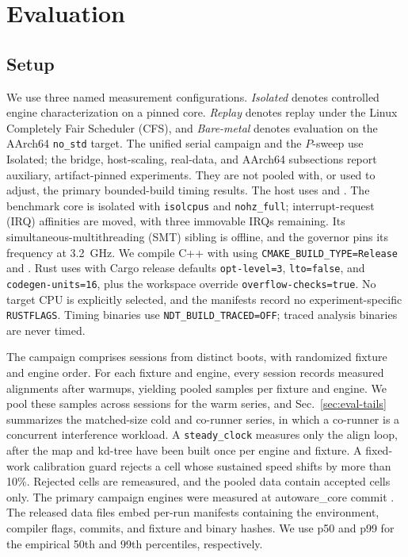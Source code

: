 \section{Evaluation}
\label{sec:evaluation}

\subsection{Setup}
\label{sec:eval-setup}
We use three named measurement configurations. \emph{Isolated} denotes controlled engine
characterization on a pinned core. \emph{Replay} denotes replay under the Linux Completely
Fair Scheduler (CFS), and \emph{Bare-metal} denotes evaluation on the AArch64
\texttt{no\_std} target. The unified serial campaign and the $P$-sweep use Isolated;
the bridge, host-scaling, real-data, and AArch64 subsections report auxiliary,
artifact-pinned experiments. They are not pooled with, or used to adjust, the primary
bounded-build timing results. The host uses \envCpu{} and \envKernel{}. The benchmark core is
isolated with \texttt{isolcpus} and \texttt{nohz\_full}; interrupt-request (IRQ)
affinities are moved, with
three immovable IRQs remaining. Its simultaneous-multithreading (SMT) sibling is offline, and the \envGovernor{}
governor pins its frequency at \SI{3.2}{GHz}. We compile C++ with \envCppCompiler{} using
\texttt{CMAKE\_BUILD\_TYPE=Release} and \envCppReleaseFlags. Rust uses
\envRustCompiler{} with Cargo release defaults \texttt{opt-level=3},
\texttt{lto=false}, and \texttt{codegen-units=16}, plus the workspace override
\texttt{overflow-checks=true}. No target CPU is explicitly selected, and the manifests
record no experiment-specific \texttt{RUSTFLAGS}. Timing binaries use
\texttt{NDT\_BUILD\_TRACED=OFF}; traced analysis binaries are never timed.

The campaign comprises \envSessions{} sessions from distinct boots, with randomized
fixture and engine order. For each fixture and engine, every session records
\envSamplesPerSession{} measured alignments after \envWarmup{} warmups, yielding
\envPooledSamples{} pooled samples per fixture and engine. We pool these samples across
sessions for the warm series, and Sec.~\ref{sec:eval-tails} summarizes the matched-size
cold and co-runner series, in which a co-runner is a concurrent interference workload.
A \texttt{steady\_clock} measures only the align loop, after the map
and kd-tree have been built once per engine and fixture. A fixed-work calibration guard
rejects a cell whose sustained speed shifts by more than 10\%. Rejected cells are
remeasured, and the pooled data contain accepted cells only. The primary campaign engines
were measured at autoware\_core commit \texttt{\envCommit}. The released data files embed per-run
manifests containing the environment, compiler flags, commits, and fixture and binary hashes.
We use p50 and p99 for the empirical 50th and 99th percentiles, respectively.

